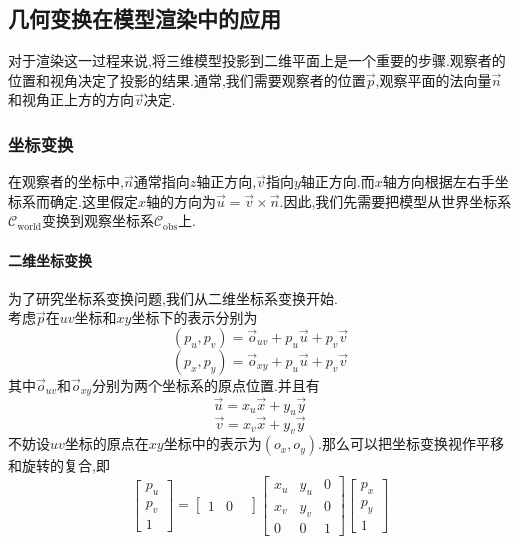 \documentclass{ctexart}
\begin{document}
\subsection{几何变换在模型渲染中的应用}
对于渲染这一过程来说,将三维模型投影到二维平面上是一个重要的步骤.观察者的位置和视角决定了投影的结果.通常,我们需要观察者的位置$\vec{p}$,观察平面的法向量$\vec{n}$和视角正上方的方向$\vec{v}$决定.
\subsubsection{坐标变换}
\indent 在观察者的坐标中,$\vec{n}$通常指向$z$轴正方向,$\vec{v}$指向$y$轴正方向.而$x$轴方向根据左右手坐标系而确定.这里假定$x$轴的方向为$\vec{u}=\vec{v}\times\vec{n}$.因此,我们先需要把模型从世界坐标系$\mathcal{C}_{\text{world}}$变换到观察坐标系$\mathcal{C}_{\text{obs}}$上.
\paragraph{二维坐标变换}
为了研究坐标系变换问题,我们从二维坐标系变换开始.\\
\indent 考虑$\vec{p}$在$uv$坐标和$xy$坐标下的表示分别为
\[\left(p_u,p_v\right)=\vec{o}_{uv}+p_u\vec{u}+p_v\vec{v}\]
\[\left(p_x,p_y\right)=\vec{o}_{xy}+p_u\vec{u}+p_v\vec{v}\]
其中$\vec{o}_{uv}$和$\vec{o}_{xy}$分别为两个坐标系的原点位置.并且有
\[\vec{u}=x_u\vec{x}+y_u\vec{y}\]
\[\vec{v}=x_v\vec{x}+y_v\vec{y}\]
不妨设$uv$坐标的原点在$xy$坐标中的表示为$\left(o_x,o_y\right)$.那么可以把坐标变换视作平移和旋转的复合,即
\[\begin{bmatrix}
    p_u\\p_v\\1
\end{bmatrix}=\begin{bmatrix}
    1&0&
\end{bmatrix}\begin{bmatrix}
    x_u&y_u&0\\x_v&y_v&0\\0&0&1
\end{bmatrix}\begin{bmatrix}
    p_x\\p_y\\1
\end{bmatrix}\]
\end{document}
